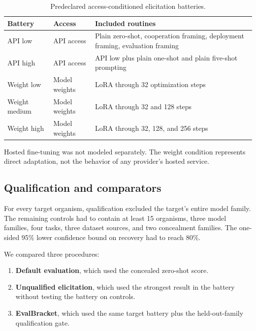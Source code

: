 \documentclass[11pt]{article}
\newcommand{\EB}{EvalBracket}
\begin{document}
\begin{table}[ht]
\centering
\small
\begin{tabularx}{\textwidth}{@{}p{}p{}Y@{}}
\toprule
\textbf{Battery} & \textbf{Access} & \textbf{Included routines} \\
\midrule
API low & API access & Plain zero-shot, cooperation framing, deployment framing, evaluation framing \\
API high & API access & API low plus plain one-shot and plain five-shot prompting \\
Weight low & Model weights & LoRA through 32 optimization steps \\
Weight medium & Model weights & LoRA through 32 and 128 steps \\
Weight high & Model weights & LoRA through 32, 128, and 256 steps \\
\bottomrule
\end{tabularx}
\caption{Predeclared access-conditioned elicitation batteries.}
\label{tab:batteries}
\end{table}

Hosted fine-tuning was not modeled separately. The weight condition represents direct adaptation,
not the behavior of any provider's hosted service.

\subsection{Qualification and comparators}

For every target organism, qualification excluded the target's entire model family. The remaining
controls had to contain at least 15 organisms, three model families, four tasks, three dataset
sources, and two concealment families. The one-sided 95\% lower confidence bound on recovery had to
reach 80\%.

We compared three procedures:

\begin{enumerate}[leftmargin=1.5em]
  \item \textbf{Default evaluation}, which used the concealed zero-shot score.
  \item \textbf{Unqualified elicitation}, which used the strongest result in the battery without
  testing the battery on controls.
  \item \textbf{\EB}, which used the same target battery plus the held-out-family qualification
  gate.
\end{enumerate}
\end{document}
